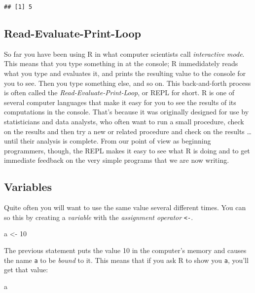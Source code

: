 \documentclass[]{book}
\makeatletter
\newenvironment{Shaded}{\begin{snugshade}}{\end{snugshade}}
\newcommand{\DecValTok}[1]{\textcolor[rgb]{0.00,0.00,0.81}{{#1}}}
\newcommand{\StringTok}[1]{\textcolor[rgb]{0.31,0.60,0.02}{{#1}}}
\newcommand{\NormalTok}[1]{{#1}}
\newenvironment{kframe}{%
\medskip{}
\setlength{\fboxsep}{.8em}
 \def\at@end@of@kframe{}%
 \ifinner\ifhmode%
  \def\at@end@of@kframe{\end{minipage}}%
  \begin{minipage}{\columnwidth}%
 \fi\fi%
 \def\FrameCommand##1{\hskip\@totalleftmargin \hskip-\fboxsep
 \colorbox{shadecolor}{##1}\hskip-\fboxsep
     \hskip-\linewidth \hskip-\@totalleftmargin \hskip\columnwidth}%
 \MakeFramed {\advance\hsize-\width
   \@totalleftmargin\z@ \linewidth\hsize
   \@setminipage}}%
 {\par\unskip\endMakeFramed%
 \at@end@of@kframe}
\renewenvironment{Shaded}{\begin{kframe}}{\end{kframe}}
\theoremstyle{definition}
\theoremstyle{definition}
\theoremstyle{remark}
\makeatother
\begin{document}
\begin{verbatim}
## [1] 5
\end{verbatim}

\subsection{Read-Evaluate-Print-Loop}\label{read-evaluate-print-loop}

So far you have been using R in what computer scientists call
\emph{interactive mode}. This means that you type something in at the
console; R immedidately reads what you type and evaluates it, and prints
the resulting value to the console for you to see. Then you type
something else, and so on. This back-and-forth process is often called
the \emph{Read-Evaluate-Print-Loop}, or REPL  for short. R
is one of several computer languages that make it easy for you to see
the results of its computations in the console. That's because it was
originally designed for use by statisticians and data analysts, who
often want to run a small procedure, check on the results and then try a
new or related procedure and check on the results \ldots{} until their
analysis is complete. From our point of view as beginning programmers,
though, the REPL makes it easy to see what R is doing and to get
immediate feedback on the very simple programs that we are now writing.

\subsection{Variables}\label{idea-variables}

Quite often you will want to use the same value several different times.
You can so this by creating a \emph{variable}  with the
\emph{assignment operator} \texttt{\textless{}-}.

\begin{Shaded}
\begin{Highlighting}[]
\NormalTok{a <-}\StringTok{ }\DecValTok{10}
\end{Highlighting}
\end{Shaded}

The previous statement puts the value 10 in the computer's memory and
causes the name \texttt{a} to be \emph{bound} to it. This means that if
you ask R to show you \texttt{a}, you'll get that value:

\begin{Shaded}
\begin{Highlighting}[]
\NormalTok{a}
\end{Highlighting}
\end{Shaded}
\end{document}
